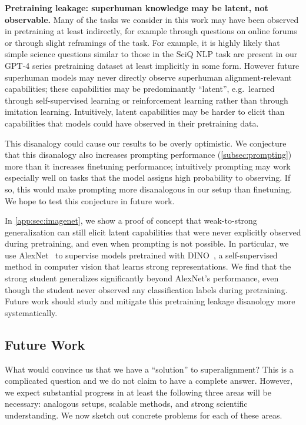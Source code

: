 \textbf{Pretraining leakage: superhuman knowledge may be latent, not observable.}\quad
\label{sec:latent_vs_observable}
Many of the tasks we consider in this work may have been observed in pretraining at least indirectly, for example through questions on online forums or through slight reframings of the task. For example, it is highly likely that simple science questions similar to those in the SciQ NLP task are present in our GPT-4 series pretraining dataset at least implicitly in some form. However future superhuman models may never directly observe superhuman alignment-relevant capabilities; these capabilities may be predominantly ``latent'', e.g.~learned through self-supervised learning or reinforcement learning rather than through imitation learning. Intuitively, latent capabilities may be harder to elicit than capabilities that models could have observed in their pretraining data.

This disanalogy could cause our results to be overly optimistic. We conjecture that this disanalogy also increases prompting performance (\ref{subsec:prompting}) more than it increases finetuning performance; intuitively prompting may work especially well on tasks that the model assigns high probability to observing. If so, this would make prompting more disanalogous in our setup than finetuning. We hope to test this conjecture in future work.

In \ref{app:sec:imagenet}, we show a proof of concept that weak-to-strong generalization can still elicit latent capabilities that were never explicitly observed during pretraining, and even when prompting is not possible. In particular, we use AlexNet~\citep{krizhevsky2012imagenet} to supervise models pretrained with DINO~\citep{caron2021emerging}, a self-supervised method in computer vision that learns strong representations. We find that the strong student generalizes significantly beyond AlexNet's performance, even though the student never observed any classification labels during pretraining. Future work should study and mitigate this pretraining leakage disanology more systematically.

\subsection{Future Work}
\label{sec:future-work}

What would convince us that we have a ``solution'' to superalignment? This is a complicated question and we do not claim to have a complete answer. However, we expect substantial progress in at least the following three areas will be necessary: analogous setups, scalable methods, and strong scientific understanding. We now sketch out concrete problems for each of these areas.

